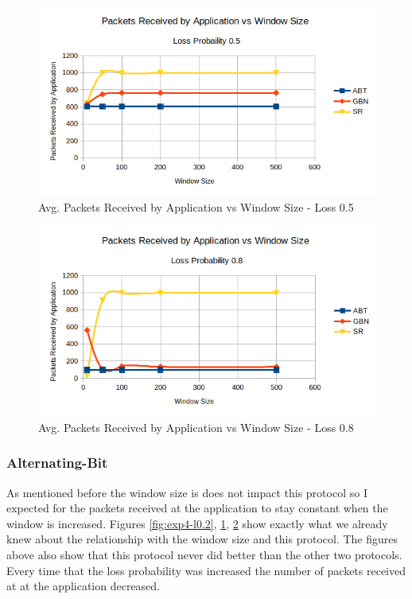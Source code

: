\documentclass[10pt, a4paper]{article}
\begin{document}
    \begin{figure}[H]
        \includegraphics[width=\textwidth]{exp4-l05.png}
        \centering
        \caption{Avg. Packets Received by Application vs Window Size - Loss 0.5  }
        \label{fig:exp4-l0.5}
    \end{figure}
        
    \begin{figure}[H]
        \includegraphics[width=\textwidth]{exp4-l08.png}
        \centering
        \caption{Avg. Packets Received by Application vs Window Size - Loss 0.8 }
        \label{fig:exp4-l0.8}
    \end{figure}
     
    \subsubsection{Alternating-Bit}
    
	    As mentioned before the window size is does not impact this protocol so I expected for the packets received at the application to stay constant when the window is increased. Figures \ref{fig:exp4-l0.2}, \ref{fig:exp4-l0.5}, \ref{fig:exp4-l0.8} show exactly what we already knew about the relationship with the window size and this protocol. The figures above also show that this protocol never did better than the other two protocols. Every time that the loss probability was increased the number of packets received at at the application decreased. 
	    
\end{document}
